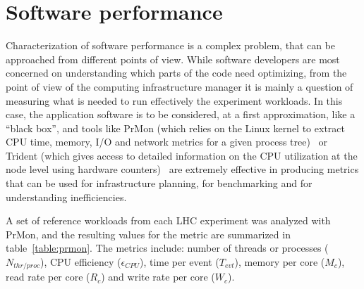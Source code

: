 \section{Software performance}
Characterization of software performance is a complex problem, that
can be approached from different points of view. While software
developers are most concerned on understanding which parts of the code
need optimizing, from the point of view of the computing
infrastructure manager it is mainly a question of measuring what is
needed to run effectively the experiment workloads. In this case, the
application software is to be considered, at a first approximation,
like a ``black box'', and tools like PrMon (which relies on the Linux
kernel to extract CPU time, memory, I/O and network metrics for a
given process tree)~\cite{prmon} or Trident (which gives access to
detailed information on the CPU utilization at the node level using
hardware counters)~\cite{trident} are extremely effective in producing
metrics that can be used for infrastructure planning, for benchmarking
and for understanding inefficiencies.

A set of reference workloads from each LHC experiment was analyzed
with PrMon, and the resulting values for the metric are summarized in
table~\ref{table:prmon}. The metrics include: number of threads or
processes ($N_{thr/proc}$), CPU efficiency ($\epsilon_{CPU}$), time per
event ($T_{evt}$), memory per core ($M_c$), read rate per core ($R_c$)
and write rate per core ($W_c$).

